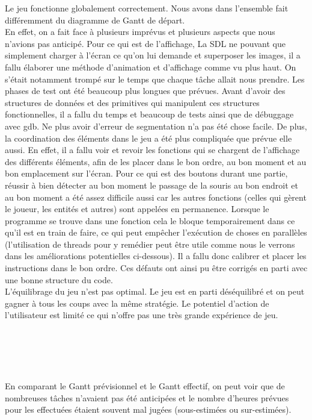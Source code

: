\documentclass[a4paper,11pt]{article}
\begin{document}
Le jeu fonctionne globalement correctement. Nous avons dans l'ensemble fait différemment du diagramme de Gantt de départ.\\
En effet, on a fait face à plusieurs imprévus et plusieurs aspects que nous n'avions pas anticipé. Pour ce qui est de l'affichage,
La SDL ne pouvant que simplement charger à l'écran ce qu'on lui demande et superposer les images, il a fallu élaborer une méthode
d'animation et d'affichage comme vu plus haut. On s'était notamment trompé sur le temps que chaque tâche allait nous prendre. Les phases
de test ont été beaucoup plus longues que prévues. Avant d'avoir des structures de données et des primitives qui manipulent ces structures
fonctionnelles, il a fallu du temps et beaucoup de tests ainsi que de débuggage avec gdb. Ne plus avoir d'erreur de segmentation n'a pas été chose facile.
De plus, la coordination des éléments dans le jeu a été plus compliquée que prévue elle aussi.
En effet, il a fallu voir et revoir les fonctions qui se chargent de l'affichage des différents éléments, afin de les placer
dans le bon ordre, au bon moment et au bon emplacement sur l'écran.
Pour ce qui est des boutons durant une partie, réussir à bien détecter au bon moment le passage de la souris 
au bon endroit et au bon moment a été assez difficile aussi car les autres fonctions (celles qui gèrent le joueur, les entités et autres) sont appelées
en permanence. Lorsque le programme se trouve dans une fonction cela le bloque temporairement dans ce qu'il est en train de faire,
ce qui peut empêcher l'exécution de choses en parallèles (l'utilisation de threads pour y remédier peut être utile comme nous le verrons dans les améliorations
potentielles ci-dessous). Il a fallu donc calibrer et placer les instructions dans le bon ordre. Ces défauts ont ainsi pu être corrigés en parti avec
une bonne structure du code. \\
L'équilibrage du jeu n'est pas optimal. Le jeu est en parti déséquilibré et on peut gagner à tous les coups avec
la même stratégie. Le potentiel d'action de l'utilisateur est limité ce qui n'offre pas une très grande expérience de jeu.\\\\\\\\\\\\
En comparant le Gantt prévisionnel et le Gantt effectif, on peut voir que de nombreuses tâches n'avaient pas été anticipées
et le nombre d'heures prévues pour les effectuées étaient souvent mal jugées (sous-estimées ou sur-estimées).
\end{document}
